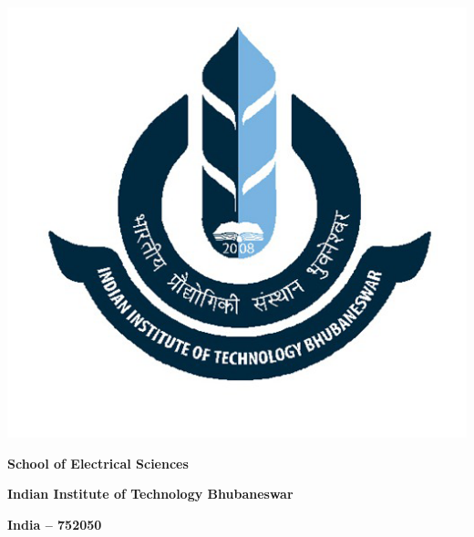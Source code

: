\documentclass{iitkgpthesis}
\begin{document}
\newpage
\thispagestyle{empty}
{~}
\vfill
\begin{center}
\includegraphics[scale=0.15]{iitbbs}
\end{center}
 \vspace{-3em}
\begin{center}
\textbf{School of Electrical Sciences}
\end{center}
 \vspace{-3em}
\begin{center}
\textbf{Indian Institute of Technology Bhubaneswar}
\end{center}
 \vspace{-3em}
\begin{center}
\textbf{India -- 752050}
\end{center}
\end{document}
